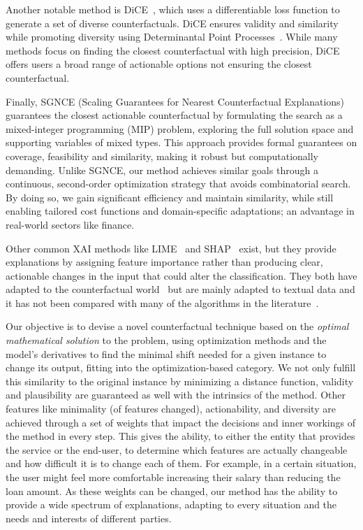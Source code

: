 \documentclass[12pt]{extarticle}
\numberwithin{equation}{section}
\begin{document}
Another notable method is DiCE~\cite{dice}, which uses a differentiable loss function to generate a set of diverse counterfactuals. DiCE ensures validity and similarity while promoting diversity using Determinantal Point Processes~\cite{dpprocess}. While many methods focus on finding the closest counterfactual with high precision, DiCE offers users a broad range of actionable options not ensuring the closest counterfactual. 

Finally, SGNCE (Scaling Guarantees for Nearest Counterfactual Explanations)~\cite{sgnce} guarantees the closest actionable counterfactual by formulating the search as a mixed-integer programming (MIP) problem, exploring the full solution space and supporting variables of mixed types. This approach provides formal guarantees on coverage, feasibility and similarity, making it robust but computationally demanding. Unlike SGNCE, our method achieves similar goals through a continuous, second-order optimization strategy that avoids combinatorial search. By doing so, we gain significant efficiency and maintain similarity, while still enabling tailored cost functions and domain-specific adaptations; an advantage in real-world sectors like finance.

Other common XAI methods like LIME~\cite{lime} and SHAP~\cite{shap} exist, but they provide explanations by assigning feature importance rather than producing clear, actionable changes in the input that could alter the classification. They both have adapted to the counterfactual world~\cite{limecshapc} but are mainly adapted to textual data and it has not been compared with many of the algorithms in the literature~\cite{guidotti2024counterfactual}.

Our objective is to devise a novel counterfactual technique based on the \emph{optimal mathematical solution} to the problem, using optimization methods and the model's derivatives to find the minimal shift needed for a given instance to change its output, fitting into the optimization-based category. We not only fulfill this similarity to the original instance by minimizing a distance function, validity and plausibility are guaranteed as well with the intrinsics of the method. Other features like minimality (of features changed), actionability, and diversity are achieved through a set of weights that impact the decisions and inner workings of the method in every step. This gives the ability, to either the entity that provides the service or the end-user, to determine which features are actually changeable and how difficult it is to change each of them. For example, in a certain situation, the user might feel more comfortable increasing their salary than reducing the loan amount. As these weights can be changed, our method has the ability to provide a wide spectrum of explanations, adapting to every situation and the needs and interests of different parties.
\end{document}
